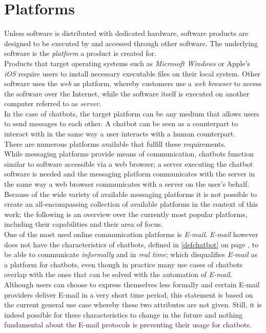 \section{Platforms}
\label{platforms}


Unless software is distributed with dedicated hardware, software products are designed to be executed by and accessed through other software.
The underlying software is the \emph{platform} a product is created for.
\\
Products that target operating systems such as \emph{Microsoft Windows} or Apple's \emph{iOS} require users to install necessary executable files on their local system.
Other software uses the \emph{web} as platform, whereby customers use a \emph{web browser} to access the software over the Internet,
while the software itself is executed on another computer referred to as \emph{server}.
\\

In the case of chatbots, the target platform can be any medium that allows users to send messages to each other.
A chatbot can be seen as a counterpart to interact with in the same way a user interacts with a human counterpart.
\\

There are numerous platforms available that fulfill these requirements.
\\

While messaging platforms provide means of communication, chatbots function similar to software accessible via a web browser;
a server executing the chatbot software is needed and the messaging platform communicates with the server in the same way a web browser communicates with a server on the user's behalf.
\\

Because of the wide variety of available messaging platforms it is not possible to create an all-encompassing collection of available platforms in the context of this work;
the following is an overview over the currently most popular platforms, including their capabilities and their area of focus.
\\

One of the most used online communication platforms is \emph{E-mail}.
\emph{E-mail} however does not have the characteristics of chatbots, defined in \ref{defchatbot} on page \pageref{defchatbot}, to be able to communicate \emph{informally} and in \emph{real time};
which disqualifies \emph{E-mail} as a platform for chatbots, even though in practice many use cases of chatbots overlap with the ones that can be solved with the automation of \emph{E-mail}.
\\
Although users can choose to express themselves less formally and certain E-mail providers deliver E-mail in a very short time period,
this statement is based on the current general use case whereby these two attributes are not given.
Still, it is indeed possible for these characteristics to change in the future
and nothing fundamental about the E-mail protocols is preventing their usage for chatbots.
\\

